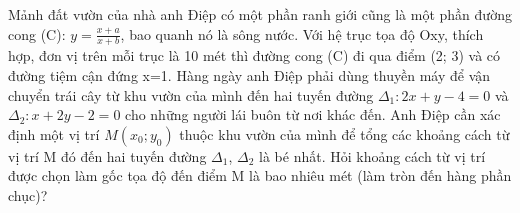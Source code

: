 \begin{question}[type=short_answer,difficulty=4,code={III-5}]
Mảnh đất vườn của nhà anh Điệp có một phần ranh giới cũng là một phần đường cong (C):
 $ y=\frac{x+a}{x+b} $, bao quanh nó là sông nước. Với hệ trục tọa độ Oxy, thích hợp, đơn vị trên mỗi trục là
10 mét thì đường cong (C) đi qua điểm (2; 3) và có đường tiệm cận đứng x=1. Hàng ngày anh Điệp phải dùng thuyền máy để vận chuyển trái cây từ khu vườn của mình đến hai tuyến đường
 $ \Delta_{1}:2x+y-4=0 $ và $ \Delta_{2}:x+2y-2=0 $ cho những người lái buôn từ nơi khác đến. Anh Điệp cần xác định một vị trí $ M(x_{0};y_{0}) $ thuộc khu vườn của mình để tổng các khoảng cách từ vị trí M đó đến hai tuyến đường $ \Delta_{1} $, $ \Delta_{2} $ là bé nhất. Hỏi khoảng cách từ vị trí được chọn làm gốc tọa độ đến điểm M là bao nhiêu mét (làm tròn đến hàng phần chục)?




\end{question}